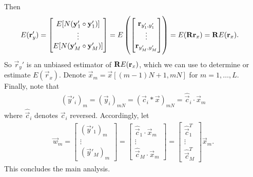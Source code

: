\documentclass[a4paper, openany, oneside]{memoir}
\begin{document}
Then
\begin{align*}
    E(\boldsymbol{\mathbf{r}}'_y) &= \begin{bmatrix}
        E[N(\boldsymbol{\mathbf{y}}'_1 \circ \boldsymbol{\mathbf{y}}'_1)] \\
        \vdots \\
        E[N(\boldsymbol{\mathbf{y}}'_M \circ \boldsymbol{\mathbf{y}}'_M)]
    \end{bmatrix}
    = E\left(\begin{bmatrix}
        \boldsymbol{\mathbf{r}}_{y'_1,y'_1} \\
        \vdots \\
        \boldsymbol{\mathbf{r}}_{y'_M,y'_M} \\
    \end{bmatrix}\right) = E(\boldsymbol{\mathbf{R}} \boldsymbol{\mathbf{r}}_x) = \boldsymbol{\mathbf{R}} E(\boldsymbol{\mathbf{r}}_x).
\end{align*}
So $\vec{r}_y'$ is an unbiased estimator of $\boldsymbol{\mathbf{R}} E(\boldsymbol{\mathbf{r}}_x)$, which we can use to determine or estimate $E(\vec{r}_x)$. Denote $\vec{x}_m = \vec{x}[(m-1)N+1,mN]$ for $m = 1,\ldots,L$. Finally, note that
\begin{align*}
    (\vec{y}'_i)_m = (\vec{y}_i)_{mN} = (\vec{c}_i \ast \vec{x})_{mN} = \hat{\vec{c}}_i \cdot \vec{x}_m
\end{align*}
where $\hat{\vec{c}}_i$ denotes $\vec{c}_i$ reversed. Accordingly, let
\begin{align*}
    \vec{w}_m = \begin{bmatrix}
        (\vec{y}'_1)_m \\
        \vdots \\
        (\vec{y}'_M)_m
    \end{bmatrix} = \begin{bmatrix}
        \hat{\vec{c}}_1 \cdot \vec{x}_m \\
        \vdots \\
        \hat{\vec{c}}_M \cdot \vec{x}_m
    \end{bmatrix} = \begin{bmatrix}
        \hat{\vec{c}}_1^T\\
        \vdots \\
        \hat{\vec{c}}_M^T
    \end{bmatrix} \vec{x}_m.
\end{align*}
This concludes the main analysis.
\end{document}
